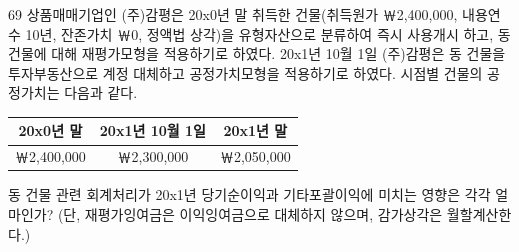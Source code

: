 \begin{question}{69}
상품매매기업인 (주)감평은 20x0년 말 취득한 건물(취득원가 ￦2,400,000, 내용연수 10년, 잔존가치 ￦0, 정액법 상각)을 유형자산으로 분류하여 즉시 사용개시 하고, 동 건물에 대해 재평가모형을 적용하기로 하였다. 20x1년 10월 1일 (주)감평은 동 건물을 투자부동산으로 계정 대체하고 공정가치모형을 적용하기로 하였다. 시점별 건물의 공정가치는 다음과 같다.
\par{\small\centering\begin{tabular}{|c|c|c|}\hline
20x0년 말 & 20x1년 10월 1일 & 20x1년 말 \\ \hline
￦2,400,000 & ￦2,300,000 & ￦2,050,000 \\ \hline
\end{tabular}\par}
동 건물 관련 회계처리가 20x1년 당기순이익과 기타포괄이익에 미치는 영향은 각각 얼마인가? (단, 재평가잉여금은 이익잉여금으로 대체하지 않으며, 감가상각은 월할계산한다.)
{\par\noindent\hspace*{2em}\par}
\begin{choices}
  \item {}
  \item {}
  \item {}
  \item {}
  \item {}
\end{choices}
\end{question}
